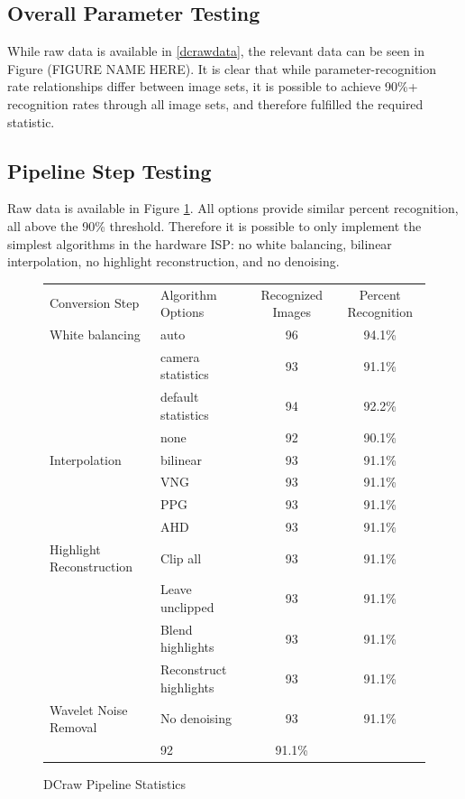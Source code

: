 \documentclass{report}
\begin{document}
	\subsection{Overall Parameter Testing}
	While raw data is available in \ref{dcrawdata}, the relevant data can be seen in Figure (FIGURE NAME HERE). It is clear that while parameter-recognition rate relationships differ between image sets, it is possible to achieve 90\%+ recognition rates through all image sets, and therefore fulfilled the required statistic.
	
	\subsection{Pipeline Step Testing}
	Raw data is available in Figure \ref{datapipeline}. All options provide similar percent recognition, all above the 90\% threshold. Therefore it is possible to only implement the simplest algorithms in the hardware ISP: no white balancing, bilinear interpolation, no highlight reconstruction, and no denoising.
	
	\begin{figure}
		\begin{center}
			\label{datapipeline}
			\caption{DCraw Pipeline Statistics}
			\begin{tabular}{llcc}
				Conversion Step & Algorithm Options & Recognized Images & Percent Recognition \\
				White balancing & auto & 96 & 94.1\%\\
				& camera statistics & 93 & 91.1\%\\
				& default statistics & 94 & 92.2\%\\
				& none & 92 & 90.1\%\\
				Interpolation & bilinear & 93 & 91.1\%\\
				& VNG & 93 & 91.1\%\\
				& PPG & 93 & 91.1\%\\
				& AHD & 93 & 91.1\%\\
				Highlight Reconstruction & Clip all & 93 & 91.1\%\\
				& Leave unclipped & 93 & 91.1\%\\
				& Blend highlights & 93 & 91.1\%\\
				& Reconstruct highlights & 93 & 91.1\%\\
				Wavelet Noise Removal & No denoising & 93 & 91.1\%\\
				& 92 & 91.1\%
			\end{tabular}
		\end{center}
	\end{figure}
	
\end{document}
